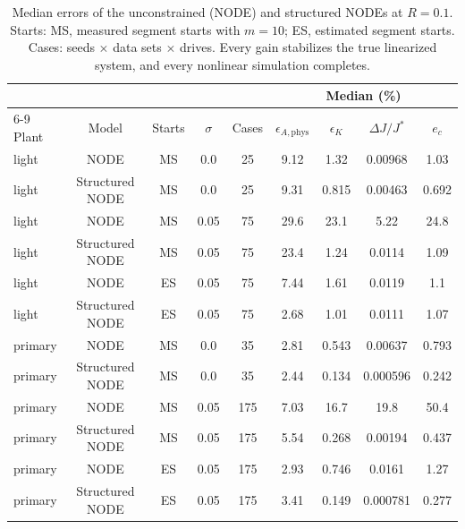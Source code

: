\begin{table}[!t]
\centering
\footnotesize
\caption{Median errors of the unconstrained (NODE) and structured NODEs at $R=0.1$. Starts: MS, measured segment starts with $m=10$; ES, estimated segment starts. Cases: seeds $\times$ data sets $\times$ drives. Every gain stabilizes the true linearized system, and every nonlinear simulation completes.}
\label{tab:r2-structure}
\setlength{\tabcolsep}{3pt}
\begin{tabular}{lcccccccc}
\toprule
 & & & & & \multicolumn{4}{c}{Median (\%)} \\
\cmidrule(lr){6-9}
Plant & Model & Starts & $\sigma$ & Cases & $\epsilon_{A,\mathrm{phys}}$ & $\epsilon_K$ & $\Delta J/J^*$ & $e_c$ \\
\midrule
light & NODE & MS & 0.0 & 25 & 9.12 & 1.32 & 0.00968 & 1.03 \\
light & Structured NODE & MS & 0.0 & 25 & 9.31 & 0.815 & 0.00463 & 0.692 \\
light & NODE & MS & 0.05 & 75 & 29.6 & 23.1 & 5.22 & 24.8 \\
light & Structured NODE & MS & 0.05 & 75 & 23.4 & 1.24 & 0.0114 & 1.09 \\
light & NODE & ES & 0.05 & 75 & 7.44 & 1.61 & 0.0119 & 1.1 \\
light & Structured NODE & ES & 0.05 & 75 & 2.68 & 1.01 & 0.0111 & 1.07 \\
primary & NODE & MS & 0.0 & 35 & 2.81 & 0.543 & 0.00637 & 0.793 \\
primary & Structured NODE & MS & 0.0 & 35 & 2.44 & 0.134 & 0.000596 & 0.242 \\
primary & NODE & MS & 0.05 & 175 & 7.03 & 16.7 & 19.8 & 50.4 \\
primary & Structured NODE & MS & 0.05 & 175 & 5.54 & 0.268 & 0.00194 & 0.437 \\
primary & NODE & ES & 0.05 & 175 & 2.93 & 0.746 & 0.0161 & 1.27 \\
primary & Structured NODE & ES & 0.05 & 175 & 3.41 & 0.149 & 0.000781 & 0.277 \\
\bottomrule
\end{tabular}
\end{table}
